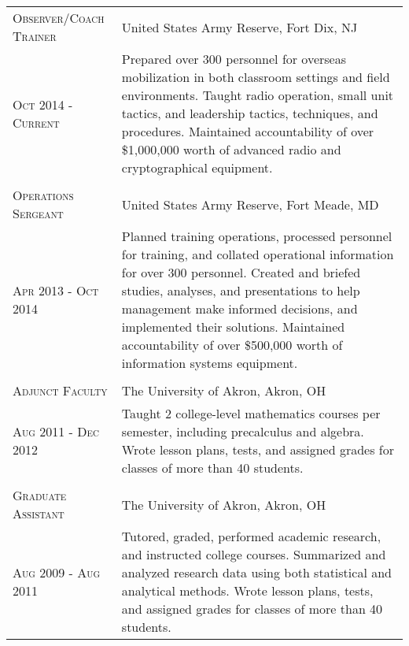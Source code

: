 \documentclass[letterpaper,10pt]{article} %
\begin{document}
\begin{center}
\begin{tabular}{R{4.25cm}L{11.25cm}}

\textsc{Observer/Coach Trainer} & United States Army Reserve, Fort Dix, NJ\\ 
\textsc{Oct 2014 - Current} & Prepared over 300 personnel for overseas mobilization in both classroom settings and field environments.  Taught radio operation, small unit tactics, and leadership tactics, techniques, and procedures.  Maintained accountability of over \$1,000,000 worth of advanced radio and cryptographical equipment.\\
 \\


\textsc{Operations Sergeant} & United States Army Reserve, Fort Meade, MD\\
\textsc{Apr 2013 - Oct 2014} & Planned training operations, processed personnel for training, and collated operational information for over 300 personnel.  Created and briefed studies, analyses, and presentations to help management make informed decisions, and implemented their solutions.  Maintained accountability of over \$500,000 worth of information systems equipment.\\
 \\


\textsc{Adjunct Faculty} & The University of Akron, Akron, OH\\
\textsc{Aug 2011 - Dec 2012} & Taught 2 college-level mathematics courses per semester, including precalculus and algebra.  Wrote lesson plans, tests, and assigned grades for classes of more than 40 students.\\
 \\


\textsc{Graduate Assistant} & The University of Akron, Akron, OH\\
\textsc{Aug 2009 - Aug 2011} & Tutored, graded, performed academic research, and instructed college courses.  Summarized and analyzed research data using both statistical and analytical methods.  Wrote lesson plans, tests, and assigned grades for classes of more than 40 students.

\end{tabular}
\end{center}
\end{document}
